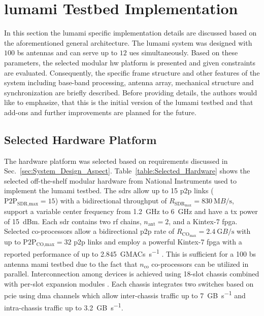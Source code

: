 \documentclass[journal]{IEEEtran}
\begin{document}
\section{\Gls{lumami} Testbed Implementation}
\label{sec:lumami_testbed_implementation}
In this section the \gls{lumami} specific implementation details are discussed based on the aforementioned general architecture.
The \gls{lumami} system was designed with $100$ \gls{bs} antennas and can serve up to $12$ \glspl{ue} simultaneously.
Based on these parameters, the selected modular \gls{hw} platform is presented and given constraints are evaluated.
Consequently, the specific frame structure and other features of the system including base-band processing, antenna array, mechanical structure and synchronization are briefly described.
Before providing details, the authors would like to emphasize, that this is the initial version of the \gls{lumami} testbed and that add-ons and further improvements are planned for the future.

%
%
%
%
%


\subsection{Selected Hardware Platform}
The hardware platform was selected based on requirements discussed in Sec.~\ref{sec:System_Design_Aspect}.
Table~\ref{table:Selected_Hardware} shows the selected off-the-shelf modular hardware from National Instruments used to implement the \gls{lumami} testbed.
The \glspl{sdr} \cite{usrp} allow up to 15 \gls{p2p} links ($\text{P2P}_\text{SDR,max}=15$) with a bidirectional throughput of $R_{\text{SDR}_\text{max}}=\SI{830}{\mega B\per\second}$, support a variable center frequency from  \SI{1.2}{\giga\hertz} to \SI{6}{\giga\hertz} and have a \gls{tx} power of \SI{15}{dBm}.
Each \gls{sdr} contains two \gls{rf} chains, \ie $n_\text{ant}=2$, and a Kintex-7 \gls{fpga}.
%
Selected co-processors \cite{flex} allow a bidirectional \gls{p2p} rate of $R_{\text{CO}_\text{max}}=\SI{2.4}{\giga B\per\second}$ with up to $\text{P2P}_\text{CO,max}=32$ \gls{p2p} links and employ a powerful Kintex-7 \gls{fpga} with a reported performance of up to \SI{2,845}{GMACs\per\second} \cite{Kintex7}.
This is sufficient for a 100 \gls{bs} antenna \gls{mami} testbed due to the fact that $n_\text{co}$ co-processors can be utilized in parallel.
Interconnection among devices is achieved using 18-slot chassis \cite{chassis} combined with per-slot expansion modules \cite{expansion_module}.
Each chassis integrates two switches based on \gls{pcie} using \gls{dma} channels which allow inter-chassis traffic up to \SI{7}{\giga B\per\second} and intra-chassis traffic up to \SI{3.2}{\giga B\per\second}.
\end{document}
